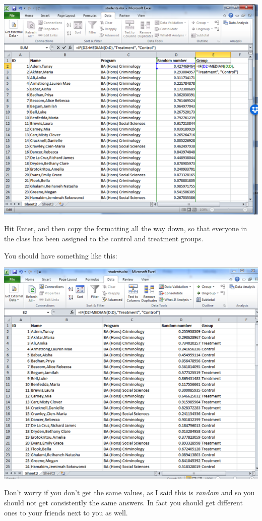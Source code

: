 \documentclass[]{book}
\theoremstyle{definition}
\theoremstyle{definition}
\theoremstyle{definition}
\theoremstyle{remark}
\begin{document}
\includegraphics{imgs/first_rand_assig.png}

Hit Enter, and then copy the formatting all the way down, so that
everyone in the class has been assigned to the control and treatment
groups.

You should have something like this:

\includegraphics{imgs/students_assigned.png}

Don't worry if you don't get the same values, as I said this is
\emph{random} and so you should not get consistently the same answers.
In fact you should get different ones to your friends next to you as
well.
\end{document}
